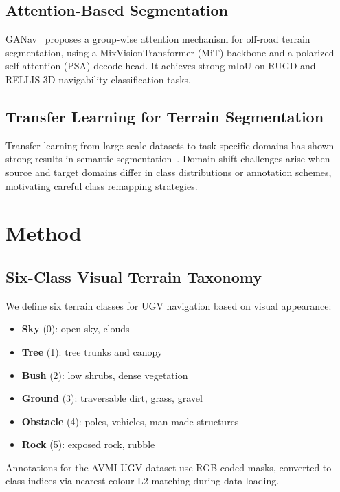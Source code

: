 \documentclass[conference]{IEEEtran}
\begin{document}
\subsection{Attention-Based Segmentation}
GANav~\cite{ganav2022} proposes a group-wise attention mechanism for off-road terrain segmentation, using a MixVisionTransformer (MiT) backbone and a polarized self-attention (PSA) decode head. It achieves strong mIoU on RUGD and RELLIS-3D navigability classification tasks.

\subsection{Transfer Learning for Terrain Segmentation}
Transfer learning from large-scale datasets to task-specific domains has shown strong results in semantic segmentation~\cite{survey2023}. Domain shift challenges arise when source and target domains differ in class distributions or annotation schemes, motivating careful class remapping strategies.

\section{Method}

\subsection{Six-Class Visual Terrain Taxonomy}
We define six terrain classes for UGV navigation based on visual appearance:
\begin{itemize}
    \item \textbf{Sky} (0): open sky, clouds
    \item \textbf{Tree} (1): tree trunks and canopy
    \item \textbf{Bush} (2): low shrubs, dense vegetation
    \item \textbf{Ground} (3): traversable dirt, grass, gravel
    \item \textbf{Obstacle} (4): poles, vehicles, man-made structures
    \item \textbf{Rock} (5): exposed rock, rubble
\end{itemize}
Annotations for the AVMI UGV dataset use RGB-coded masks, converted to class indices via nearest-colour L2 matching during data loading.
\end{document}
